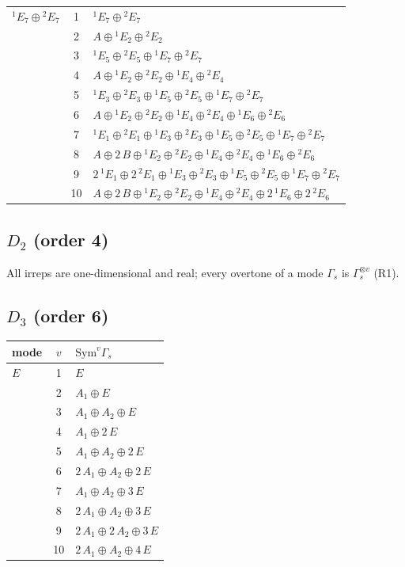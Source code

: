 \documentclass[11pt]{article}
\begin{document}
\begin{longtable}{l c p{}}
\hline
${}^{1}E_{7}\oplus {}^{2}E_{7}$ & 1 & ${}^{1}E_{7}\oplus {}^{2}E_{7}$\\
 & 2 & $A\oplus {}^{1}E_{2}\oplus {}^{2}E_{2}$\\
 & 3 & ${}^{1}E_{5}\oplus {}^{2}E_{5}\oplus {}^{1}E_{7}\oplus {}^{2}E_{7}$\\
 & 4 & $A\oplus {}^{1}E_{2}\oplus {}^{2}E_{2}\oplus {}^{1}E_{4}\oplus {}^{2}E_{4}$\\
 & 5 & ${}^{1}E_{3}\oplus {}^{2}E_{3}\oplus {}^{1}E_{5}\oplus {}^{2}E_{5}\oplus {}^{1}E_{7}\oplus {}^{2}E_{7}$\\
 & 6 & $A\oplus {}^{1}E_{2}\oplus {}^{2}E_{2}\oplus {}^{1}E_{4}\oplus {}^{2}E_{4}\oplus {}^{1}E_{6}\oplus {}^{2}E_{6}$\\
 & 7 & ${}^{1}E_{1}\oplus {}^{2}E_{1}\oplus {}^{1}E_{3}\oplus {}^{2}E_{3}\oplus {}^{1}E_{5}\oplus {}^{2}E_{5}\oplus {}^{1}E_{7}\oplus {}^{2}E_{7}$\\
 & 8 & $A\oplus 2\,B\oplus {}^{1}E_{2}\oplus {}^{2}E_{2}\oplus {}^{1}E_{4}\oplus {}^{2}E_{4}\oplus {}^{1}E_{6}\oplus {}^{2}E_{6}$\\
 & 9 & $2\,{}^{1}E_{1}\oplus 2\,{}^{2}E_{1}\oplus {}^{1}E_{3}\oplus {}^{2}E_{3}\oplus {}^{1}E_{5}\oplus {}^{2}E_{5}\oplus {}^{1}E_{7}\oplus {}^{2}E_{7}$\\
 & 10 & $A\oplus 2\,B\oplus {}^{1}E_{2}\oplus {}^{2}E_{2}\oplus {}^{1}E_{4}\oplus {}^{2}E_{4}\oplus 2\,{}^{1}E_{6}\oplus 2\,{}^{2}E_{6}$\\
\hline
\end{longtable}

\subsection*{$D_{2}$ \quad (order 4)}
All irreps are one-dimensional and real; every overtone of a mode $\Gamma_s$ is $\Gamma_s^{\otimes v}$ (R1).

\subsection*{$D_{3}$ \quad (order 6)}
\begin{longtable}{l c p{}}
\hline mode & $v$ & $\mathrm{Sym}^v\Gamma_s$\\ \hline\endhead
$E$ & 1 & $E$\\
 & 2 & $A_{1}\oplus E$\\
 & 3 & $A_{1}\oplus A_{2}\oplus E$\\
 & 4 & $A_{1}\oplus 2\,E$\\
 & 5 & $A_{1}\oplus A_{2}\oplus 2\,E$\\
 & 6 & $2\,A_{1}\oplus A_{2}\oplus 2\,E$\\
 & 7 & $A_{1}\oplus A_{2}\oplus 3\,E$\\
 & 8 & $2\,A_{1}\oplus A_{2}\oplus 3\,E$\\
 & 9 & $2\,A_{1}\oplus 2\,A_{2}\oplus 3\,E$\\
 & 10 & $2\,A_{1}\oplus A_{2}\oplus 4\,E$\\
\hline
\end{longtable}
\end{document}
